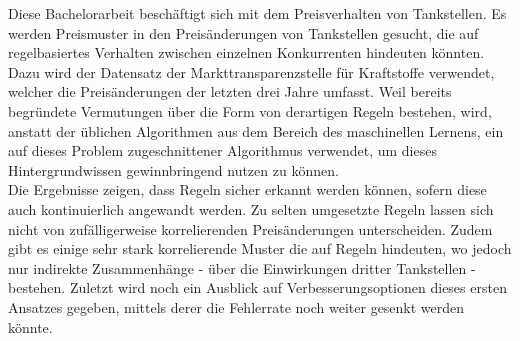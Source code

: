 \thispagestyle{empty}

Diese Bachelorarbeit beschäftigt sich mit dem Preisverhalten von Tankstellen. Es werden Preismuster in den Preisänderungen von Tankstellen gesucht, die auf regelbasiertes Verhalten zwischen einzelnen Konkurrenten hindeuten könnten. Dazu wird der Datensatz der Markttransparenzstelle für Kraftstoffe verwendet, welcher die Preisänderungen der letzten drei Jahre umfasst. Weil bereits begründete Vermutungen über die Form von derartigen Regeln bestehen, wird, anstatt der üblichen Algorithmen aus dem Bereich des maschinellen Lernens, ein auf dieses Problem zugeschnittener Algorithmus verwendet, um dieses Hintergrundwissen gewinnbringend nutzen zu können.\\ 
Die Ergebnisse zeigen, dass Regeln sicher erkannt werden können, sofern diese auch kontinuierlich angewandt werden. Zu selten umgesetzte Regeln lassen sich nicht von zufälligerweise korrelierenden Preisänderungen unterscheiden. Zudem gibt es einige sehr stark korrelierende Muster die auf Regeln hindeuten, wo jedoch nur indirekte Zusammenhänge - über die Einwirkungen dritter Tankstellen - bestehen. Zuletzt wird noch ein Ausblick auf Verbesserungsoptionen dieses ersten Ansatzes gegeben, mittels derer die Fehlerrate noch weiter gesenkt werden könnte. 